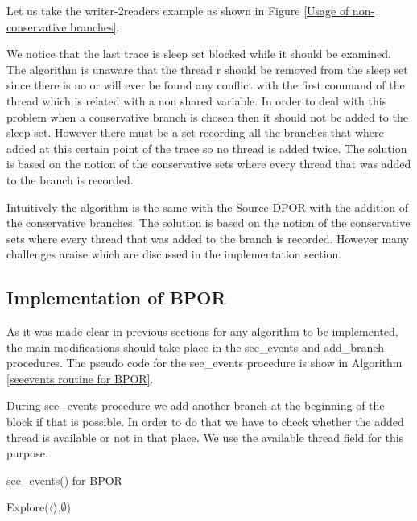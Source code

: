 Let us take the writer-2readers example as shown in Figure \ref{Usage of non-conservative branches}.


We notice that the last trace is sleep set blocked while it should be examined. The algorithm is unaware that the thread r should be removed from the sleep set since there is no
or will ever be found any conflict with the first command of the thread which is related with a non shared variable. In order to deal with this problem when a conservative
branch is chosen then it should not be added to the sleep set. However there must be a set recording all the branches that where added at this certain point of the trace
so no thread is added twice. The solution is based on the notion of the conservative sets where every thread that was added to the branch is recorded. 

Intuitively the algorithm is the same with the Source-DPOR with the addition of the conservative branches. The solution is based on the notion of the conservative sets where every thread that was added to the branch is recorded.  However many challenges araise which are discussed 
in the implementation section.


\subsection{Implementation of BPOR}
As it was made clear in previous sections for any algorithm to be implemented, the main modifications should take place in the see\_events and add\_branch procedures. 
The pseudo code for the see\_events procedure is show in Algorithm \ref{seeevents routine for BPOR}.

During see\_events procedure we add another branch at the beginning of the block if that is possible. In order to do that we have to check whether the added thread
is available or not in that place. We use the available thread field for this purpose.

\begin{algorithm}[H]
    \caption{see\_events() for BPOR}
    \label{seeevents routine for BPOR}
    Explore($\langle \rangle$,$\emptyset$)\;
\end{algorithm}

